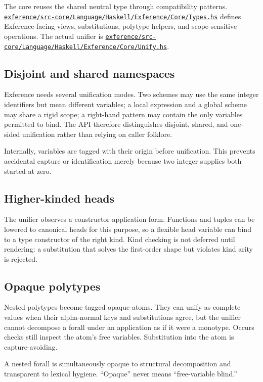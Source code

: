 \documentclass[10pt,letterpaper,oneside]{report}
\def\DjexBase{https://github.com/VladimirReshetnikov/Djex/blob/d3d9662598460316bdcd177ce6768c521e764aa8/}
\newcommand{\dpath}[1]{\href{\DjexBase#1}{\nolinkurl{#1}}}
\begin{document}
The core reuses the shared neutral type through compatibility patterns. \dpath{exference/src-core/Language/Haskell/Exference/Core/Types.hs} defines Exference-facing views, substitutions, polytype helpers, and scope-sensitive operations. The actual unifier is \dpath{exference/src-core/Language/Haskell/Exference/Core/Unify.hs}.

\subsection{Disjoint and shared namespaces}

Exference needs several unification modes. Two schemes may use the same integer identifiers but mean different variables; a local expression and a global scheme may share a rigid scope; a right-hand pattern may contain the only variables permitted to bind. The API therefore distinguishes disjoint, shared, and one-sided unification rather than relying on caller folklore.

Internally, variables are tagged with their origin before unification. This prevents accidental capture or identification merely because two integer supplies both started at zero.

\subsection{Higher-kinded heads}

The unifier observes a constructor-application form. Functions and tuples can be lowered to canonical heads for this purpose, so a flexible head variable can bind to a type constructor of the right kind. Kind checking is not deferred until rendering: a substitution that solves the first-order shape but violates kind arity is rejected.

\subsection{Opaque polytypes}

Nested polytypes become tagged opaque atoms. They can unify as complete values when their alpha-normal keys and substitutions agree, but the unifier cannot decompose a forall under an application as if it were a monotype. Occurs checks still inspect the atom's free variables. Substitution into the atom is capture-avoiding.

\begin{invariantbox}
A nested forall is simultaneously opaque to structural decomposition and transparent to lexical hygiene. ``Opaque'' never means ``free-variable blind.''
\end{invariantbox}
\end{document}
